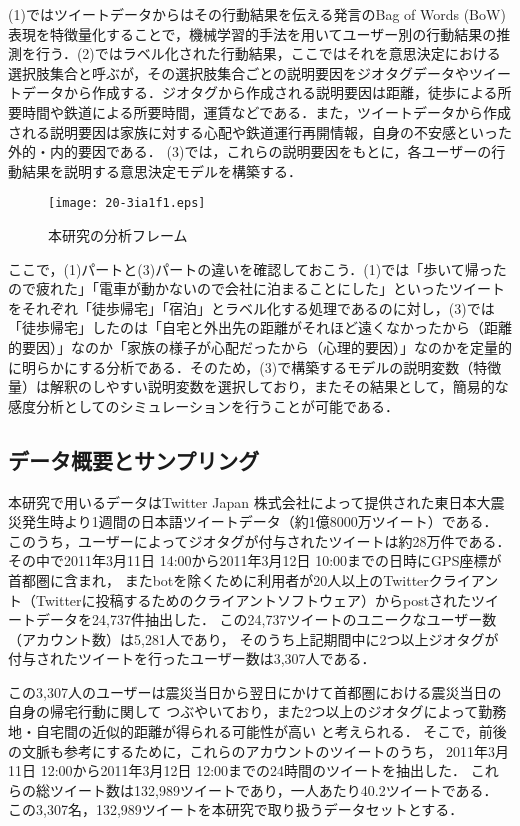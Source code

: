 \documentclass[japanese]{jnlp_1.4}
\begin{document}
(1)ではツイートデータからはその行動結果を伝える発言のBag of Words (BoW)表現を特徴量化することで，機械学習的手法を用いてユーザー別の行動結果の推測を行う．(2)ではラベル化された行動結果，ここではそれを意思決定における選択肢集合と呼ぶが，その選択肢集合ごとの説明要因をジオタグデータやツイートデータから作成する．ジオタグから作成される説明要因は距離，徒歩による所要時間や鉄道による所要時間，運賃などである．また，ツイートデータから作成される説明要因は家族に対する心配や鉄道運行再開情報，自身の不安感といった
外的・内的要因である．
(3)では，これらの説明要因をもとに，各ユーザーの行動結果を説明する意思決定モデルを構築する．

\begin{figure}[t]
\begin{center}
\texttt{[image: 20-3ia1f1.eps]}
\end{center}
\caption{本研究の分析フレーム}
\label{fig:frame}
\end{figure}

ここで，(1)パートと(3)パートの違いを確認しておこう．(1)では「歩いて帰ったので疲れた」「電車が動かないので会社に泊まることにした」といったツイートをそれぞれ「徒歩帰宅」「宿泊」とラベル化する処理であるのに対し，(3)では「徒歩帰宅」したのは「自宅と外出先の距離がそれほど遠くなかったから（距離的要因）」なのか「家族の様子が心配だったから（心理的要因）」なのかを定量的に明らかにする分析である．そのため，(3)で構築するモデルの説明変数（特徴量）は解釈のしやすい説明変数を選択しており，またその結果として，簡易的な感度分析としてのシミュレーションを行うことが可能である．



\subsection{データ概要とサンプリング}

本研究で用いるデータはTwitter Japan 株式会社によって提供された東日本大震災発生時より1週間の日本語ツイートデータ（約1億8000万ツイート）である．
このうち，ユーザーによってジオタグが付与されたツイートは約28万件である．
その中で2011年3月11日 14:00から2011年3月12日 10:00までの日時にGPS座標が首都圏に含まれ，
またbotを除くために利用者が20人以上のTwitterクライアント（Twitterに投稿するためのクライアントソフトウェア）からpostされたツイートデータを24,737件抽出した．
この24,737ツイートのユニークなユーザー数（アカウント数）は5,281人であり，
そのうち上記期間中に2つ以上ジオタグが付与されたツイートを行ったユーザー数は3,307人である．

この3,307人のユーザーは震災当日から翌日にかけて首都圏における震災当日の自身の帰宅行動に関して
つぶやいており，また2つ以上のジオタグによって勤務地・自宅間の近似的距離が得られる可能性が高い
と考えられる．
そこで，前後の文脈も参考にするために，これらのアカウントのツイートのうち，
2011年3月11日 12:00から2011年3月12日 12:00までの24時間のツイートを抽出した．
これらの総ツイート数は132,989ツイートであり，一人あたり40.2ツイートである．
この3,307名，132,989ツイートを本研究で取り扱うデータセットとする．
\end{document}

